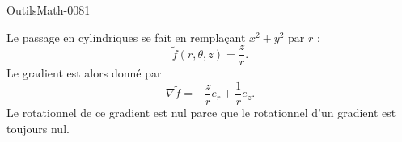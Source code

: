 
\begin{corrige}{OutilsMath-0081}

    Le passage en cylindriques se fait en remplaçant $x^2+y^2$ par $r$ :
    \begin{equation}
        \tilde f(r,\theta,z)=\frac{ z }{ r }.
    \end{equation}
    Le gradient est alors donné par
    \begin{equation}
        \nabla \tilde f=-\frac{ z }{ r }e_r+\frac{1}{ r }e_z.
    \end{equation}
    Le rotationnel de ce gradient est nul parce que le rotationnel d'un gradient est toujours nul.

\end{corrige}
